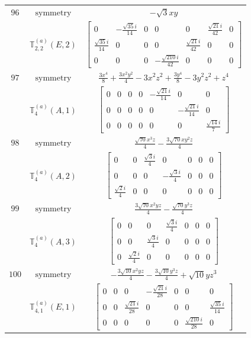 \documentclass[fleqn,8pt,landscape]{jsarticle}
\begin{document}
\begin{longtable}{ccc}
$ 96 $ & $ \text{symmetry} $ & $ - \sqrt{3} x y $ \\
$  $ & $ \mathbb{T}_{2,2}^{(a)}(E,2) $ & $ \begin{bmatrix} 0 & - \frac{\sqrt{35} i}{14} & 0 & 0 & 0 & \frac{\sqrt{21} i}{42} & 0 \\ \frac{\sqrt{35} i}{14} & 0 & 0 & 0 & \frac{\sqrt{21} i}{42} & 0 & 0 \\ 0 & 0 & 0 & - \frac{\sqrt{210} i}{42} & 0 & 0 & 0 \end{bmatrix} $ \\ \hline
$ 97 $ & $ \text{symmetry} $ & $ \frac{3 x^{4}}{8} + \frac{3 x^{2} y^{2}}{4} - 3 x^{2} z^{2} + \frac{3 y^{4}}{8} - 3 y^{2} z^{2} + z^{4} $ \\
$  $ & $ \mathbb{T}_{4}^{(a)}(A,1) $ & $ \begin{bmatrix} 0 & 0 & 0 & 0 & - \frac{\sqrt{21} i}{14} & 0 & 0 \\ 0 & 0 & 0 & 0 & 0 & - \frac{\sqrt{21} i}{14} & 0 \\ 0 & 0 & 0 & 0 & 0 & 0 & \frac{\sqrt{14} i}{7} \end{bmatrix} $ \\ \hline
$ 98 $ & $ \text{symmetry} $ & $ \frac{\sqrt{70} x^{3} z}{4} - \frac{3 \sqrt{70} x y^{2} z}{4} $ \\
$  $ & $ \mathbb{T}_{4}^{(a)}(A,2) $ & $ \begin{bmatrix} 0 & 0 & \frac{\sqrt{3} i}{4} & 0 & 0 & 0 & 0 \\ 0 & 0 & 0 & - \frac{\sqrt{3} i}{4} & 0 & 0 & 0 \\ \frac{\sqrt{2} i}{4} & 0 & 0 & 0 & 0 & 0 & 0 \end{bmatrix} $ \\ \hline
$ 99 $ & $ \text{symmetry} $ & $ \frac{3 \sqrt{70} x^{2} y z}{4} - \frac{\sqrt{70} y^{3} z}{4} $ \\
$  $ & $ \mathbb{T}_{4}^{(a)}(A,3) $ & $ \begin{bmatrix} 0 & 0 & 0 & \frac{\sqrt{3} i}{4} & 0 & 0 & 0 \\ 0 & 0 & \frac{\sqrt{3} i}{4} & 0 & 0 & 0 & 0 \\ 0 & \frac{\sqrt{2} i}{4} & 0 & 0 & 0 & 0 & 0 \end{bmatrix} $ \\ \hline
$ 100 $ & $ \text{symmetry} $ & $ - \frac{3 \sqrt{10} x^{2} y z}{4} - \frac{3 \sqrt{10} y^{3} z}{4} + \sqrt{10} y z^{3} $ \\
$  $ & $ \mathbb{T}_{4,1}^{(a)}(E,1) $ & $ \begin{bmatrix} 0 & 0 & 0 & - \frac{\sqrt{21} i}{28} & 0 & 0 & 0 \\ 0 & 0 & \frac{\sqrt{21} i}{28} & 0 & 0 & 0 & \frac{\sqrt{35} i}{14} \\ 0 & 0 & 0 & 0 & 0 & \frac{\sqrt{210} i}{28} & 0 \end{bmatrix} $ \\ \hline

\end{longtable}
\end{document}
